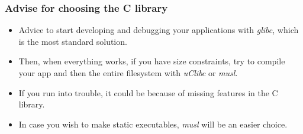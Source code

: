 \begin{frame}
  \frametitle{Advise for choosing the C library}
  \begin{itemize}
  \item Advice to start developing and debugging your applications with
        {\em glibc}, which is the most standard solution.
  \item Then, when everything works, if you have size constraints, try to compile
        your app and then the entire filesystem with {\em uClibc} or {\em musl}.
  \item If you run into trouble, it could be because of missing features
        in the C library.
  \item In case you wish to make static executables, {\em musl} will be
        an easier choice.
  \end{itemize}
\end{frame}

